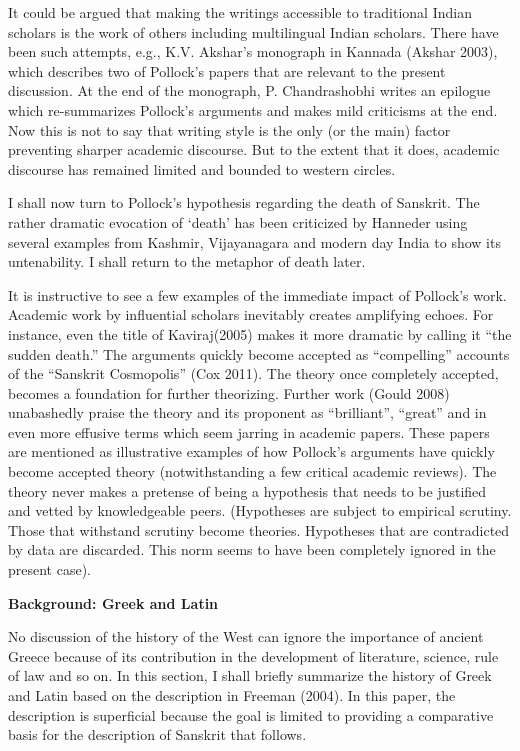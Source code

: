 It could be argued that making the writings accessible to traditional Indian scholars is the work of others including multilingual Indian scholars. There have been such attempts, e.g., K.V. Akshar’s monograph in Kannada (Akshar 2003), which describes two of Pollock’s papers that are relevant to the present discussion. At the end of the monograph, P. Chandrashobhi writes an epilogue which re-summarizes Pollock’s arguments and makes mild criticisms at the end. Now this is not to say that writing style is the only (or the main) factor preventing sharper academic discourse. But to the extent that it does, academic discourse has remained limited and bounded to western circles. 

I shall now turn to Pollock’s hypothesis regarding the death of Sanskrit. The rather dramatic evocation of ‘death’ has been criticized by Hanneder using several examples from Kashmir, Vijayanagara and modern day India to show its untenability. I shall return to the metaphor of death later.

It is instructive to see a few examples of the immediate impact of Pollock’s work. Academic work by influential scholars inevitably creates amplifying echoes. For instance, even the title of Kaviraj(2005) makes it more dramatic by calling it “the sudden death.” The arguments quickly become accepted as “compelling” accounts of the “Sanskrit Cosmopolis” (Cox 2011). The theory once completely accepted, becomes a foundation for further theorizing. Further work (Gould 2008) unabashedly praise the theory and its proponent as “brilliant”, “great” and in even more effusive terms which seem jarring in academic papers. These papers are mentioned as illustrative examples of how Pollock’s arguments have quickly become accepted theory (notwithstanding a few critical academic reviews). The theory never makes a pretense of being a hypothesis that needs to be justified and vetted by knowledgeable peers. (Hypotheses are subject to empirical scrutiny. Those that withstand scrutiny become theories. Hypotheses that are contradicted by data are discarded. This norm seems to have been completely ignored in the present case). 
\medskip

{\bf Background: Greek and Latin}
\smallskip

No discussion of the history of the West can ignore the importance of ancient Greece because of its contribution in the development of literature, science, rule of law and so on. In this section, I shall briefly summarize the history of Greek and Latin based on the description in Freeman (2004). In this paper, the description is superficial because the goal is limited to providing a comparative basis for the description of Sanskrit that follows. 


